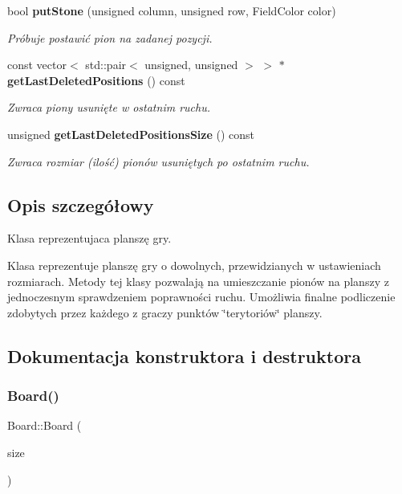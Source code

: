 \begin{DoxyCompactItemize}
bool \textbf{ put\+Stone} (unsigned column, unsigned row, Field\+Color color)
\begin{DoxyCompactList}\small\item\em Próbuje postawić pion na zadanej pozycji. \end{DoxyCompactList}\item 
const vector$<$ std\+::pair$<$ unsigned, unsigned $>$ $>$ $\ast$ \textbf{ get\+Last\+Deleted\+Positions} () const
\begin{DoxyCompactList}\small\item\em Zwraca piony usunięte w ostatnim ruchu. \end{DoxyCompactList}\item 
unsigned \textbf{ get\+Last\+Deleted\+Positions\+Size} () const
\begin{DoxyCompactList}\small\item\em Zwraca rozmiar (ilość) pionów usuniętych po ostatnim ruchu. \end{DoxyCompactList}\end{DoxyCompactItemize}


\subsection{Opis szczegółowy}
Klasa reprezentujaca planszę gry. 

Klasa reprezentuje planszę gry o dowolnych, przewidzianych w ustawieniach rozmiarach. Metody tej klasy pozwalają na umieszczanie pionów na planszy z jednoczesnym sprawdzeniem poprawności ruchu. Umożliwia finalne podliczenie zdobytych przez każdego z graczy punktów \char`\"{}terytoriów\char`\"{} planszy. 

\subsection{Dokumentacja konstruktora i destruktora}
\mbox{\label{class_board_a832937a49be9c3f8d550f62965bb6f8f}} 
\subsubsection{Board()}
{\footnotesize\ttfamily Board\+::\+Board (\begin{DoxyParamCaption}\item[{Board\+Size}]{size }\end{DoxyParamCaption})}



